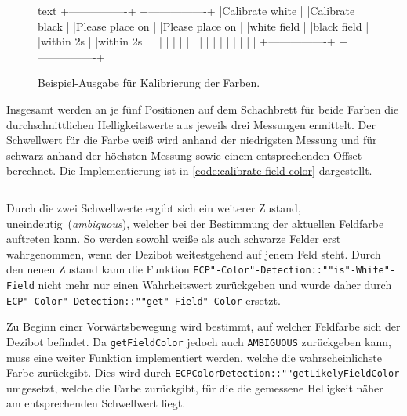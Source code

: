 \begin{figure}[h]
\centering
\begin{cminted}{text}
+----------------+    +----------------+
|Calibrate white |    |Calibrate black |
|Please place on |    |Please place on |
|white field     |    |black field     |
|within 2s       |    |within 2s       |
|                |    |                |
|                |    |                |
|                |    |                |
|                |    |                |
+----------------+    +----------------+
\end{cminted}
\caption{Beispiel-Ausgabe für Kalibrierung der Farben.}
\label{fig:colour-calibration-display-print}
\end{figure}

Insgesamt werden an je fünf Positionen auf dem Schachbrett für beide Farben die durchschnittlichen Helligkeitswerte aus jeweils drei Messungen ermittelt. Der Schwellwert für die Farbe weiß wird anhand der niedrigsten Messung und für schwarz anhand der höchsten Messung sowie einem entsprechenden Offset berechnet. Die Implementierung ist in \autoref{code:calibrate-field-color} dargestellt.

\begin{listing}[h]
    \inputminted{cpp}{../assets/code/ECPColorDetection-calibrateFieldColor.cpp}
    \caption{Code"=Ausschnitt zur \texttt{ECP"-Color"-Detection::""calibrate\-Field\-Color}"=Funktion.}
    \label{code:calibrate-field-color}
\end{listing}

Durch die zwei Schwellwerte ergibt sich ein weiterer Zustand, uneindeutig~(\emph{ambiguous}), welcher bei der Bestimmung der aktuellen Feldfarbe auftreten kann. So werden sowohl weiße als auch schwarze Felder erst wahrgenommen, wenn der Dezibot weitestgehend auf jenem Feld steht. Durch den neuen Zustand kann die Funktion \texttt{ECP"-Color"-Detection::""is"-White"-Field} nicht mehr nur einen Wahrheitswert zurückgeben und wurde daher durch \texttt{ECP"-Color"-Detection::""get"-Field"-Color} ersetzt.

Zu Beginn einer Vorwärtsbewegung wird bestimmt, auf welcher Feldfarbe sich der Dezibot befindet. Da \texttt{get\-Field\-Color} jedoch auch \texttt{AMBIGUOUS} zurückgeben kann, muss eine weiter Funktion implementiert werden, welche die wahrscheinlichste Farbe zurückgibt. Dies wird durch \texttt{ECP\-Color\-Detection::""get\-Likely\-Field\-Color} umgesetzt, welche die Farbe zurückgibt, für die die gemessene Helligkeit näher am entsprechenden Schwellwert liegt.

